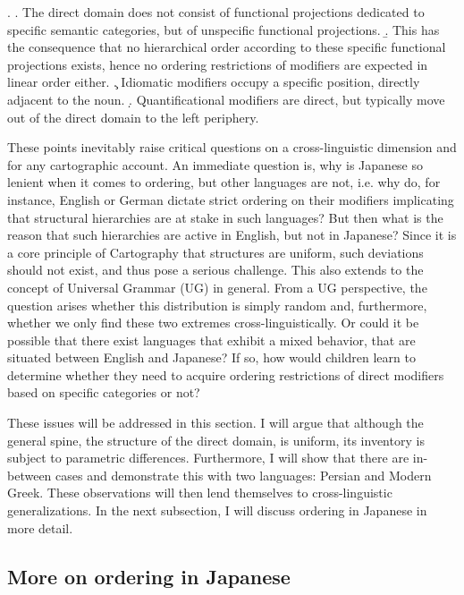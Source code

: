 \ex. \a. The direct domain does not consist of functional projections dedicated to specific semantic categories, but of unspecific functional projections.
\b. This has the consequence that no hierarchical order according to these specific functional projections exists, hence no ordering restrictions of modifiers are expected in linear order either.
\c. Idiomatic modifiers occupy a specific position, directly adjacent to the noun.
\d. Quantificational modifiers are direct, but typically move out of the direct domain to the left periphery.

These points inevitably raise critical questions on a cross-linguistic dimension and for any cartographic account. An immediate question is, why is Japanese so lenient when it comes to ordering, but other languages are not, i.e. why do, for instance, English or German dictate strict ordering on their modifiers implicating that structural hierarchies are at stake in such languages? But then what is the reason that such hierarchies are active in  English, but not in Japanese? Since it is a core principle of Cartography that structures are uniform, such deviations should not exist, and thus pose a serious challenge. This also extends to the concept of Universal Grammar (UG) in general. From a UG perspective, the question arises whether this distribution is simply random and, furthermore, whether we only find these two extremes cross-linguistically. Or could it be possible that there exist languages that exhibit a mixed behavior, that are situated between English and Japanese? If so, how would children learn to determine whether they need to acquire ordering restrictions of direct modifiers based on specific categories or not?

These issues will be addressed in this section. I will argue that although the general spine, the structure of the direct domain, is uniform, its inventory is subject to parametric differences. Furthermore, I will show that there are in-between cases and demonstrate this with two languages:  Persian and  Modern Greek. These observations will then lend themselves to cross-linguistic generalizations. In the next subsection, I will discuss ordering in Japanese in more detail.

\subsection{More on ordering in Japanese}

